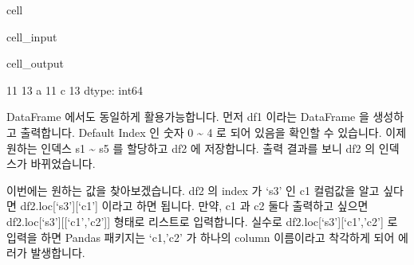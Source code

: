 \documentclass[letterpaper,10pt,english]{jupyterBook}
\begin{document}
\begin{sphinxuseclass}{cell}\begin{sphinxVerbatimInput}

\begin{sphinxuseclass}{cell_input}
\begin{sphinxVerbatim}[commandchars=\\\{\}]
\PYG{p}{[}\PYG{p}{]} \PYG{p}{[}\PYG{p}{]}
\PYG{p}{[}\PYG{p}{[}\PYG{p}{]}\PYG{p}{]}
\end{sphinxVerbatim}

\end{sphinxuseclass}\end{sphinxVerbatimInput}
\begin{sphinxVerbatimOutput}

\begin{sphinxuseclass}{cell_output}
\begin{sphinxVerbatim}[commandchars=\\\{\}]
11 13
a    11
c    13
dtype: int64
\end{sphinxVerbatim}

\end{sphinxuseclass}\end{sphinxVerbatimOutput}

\end{sphinxuseclass}
\sphinxAtStartPar
 DataFrame 에서도 동일하게 활용가능합니다. 먼저 df1 이라는 DataFrame 을 생성하고 출력합니다. Default Index 인 숫자 0 \textasciitilde{} 4 로 되어 있음을 확인할 수 있습니다. 이제 원하는 인덱스 s1 \textasciitilde{} s5 를 할당하고 df2 에 저장합니다. 출력 결과를 보니 df2 의 인덱스가 바뀌었습니다.

\sphinxAtStartPar
이번에는 원하는 값을 찾아보겠습니다. df2 의 index 가 ‘s3’ 인 c1 컬럼값을 알고 싶다면 df2.loc{[}‘s3’{]}{[}‘c1’{]} 이라고 하면 됩니다. 만약, c1 과 c2 둘다 출력하고 싶으면  df2.loc{[}‘s3’{]}{[}{[}‘c1’,’c2’{]}{]} 형태로 리스트로 입력합니다. 실수로 df2.loc{[}‘s3’{]}{[}‘c1’,’c2’{]} 로 입력을 하면 Pandas 패키지는 ‘c1,’c2’ 가 하나의 column 이름이라고 착각하게 되어 에러가 발생합니다.
\end{document}
